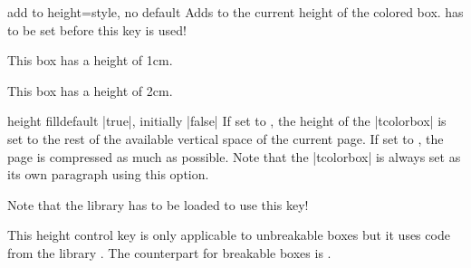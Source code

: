 \clearpage

\begin{docTcbKey}[][doc new=2014-11-07]{add to height}{=}{style, no default}
  Adds  to the current height of the colored box.
   has to be set before this key is used!
\begin{dispExample}

\begin{tcolorbox}
  This box has a height of 1cm.
\end{tcolorbox}
\begin{tcolorbox}[add to height=1cm]
  This box has a height of 2cm.
\end{tcolorbox}
\end{dispExample}
\end{docTcbKey}


\begin{docTcbKey}[][doc new and updated={2014-09-22}{2014-12-15}]{height fill}{}{default |true|, initially |false|}
If set to , the height of the |tcolorbox| is set to the rest of the
available vertical space of the current page.
If set to , the page is compressed as much as possible.
Note that the |tcolorbox|
is always set as its own paragraph using this option.
\begin{marker}
Note that the library  has to be loaded to use this key!
\end{marker}
This height control key is only applicable to unbreakable boxes but it
uses code from the library .
The counterpart for breakable boxes is .

\begin{dispListing}
\begin{tcolorbox}[height fill,
  colback=red!5!white,colframe=red!75!black,fonttitle=\bfseries,
  title=Box which fills the rest of the page]
\lipsum[1]
\end{tcolorbox}
\end{dispListing}
\end{docTcbKey}
{\tcbusetemp}

